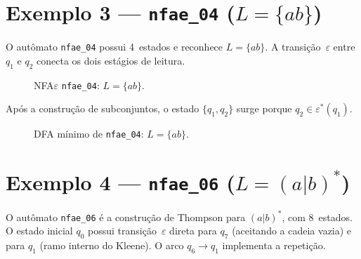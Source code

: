 \documentclass[sumario=abnt-6027-2012]{ifes8}
\newcommand{\eps}{\varepsilon}
\begin{document}
\section{Exemplo 3 --- \texttt{nfae\_04} \texorpdfstring{($L = \{ab\}$)}{(L = {ab})}}

O autômato \texttt{nfae\_04} possui 4~estados e reconhece $L = \{ab\}$.
A transição~$\varepsilon$ entre $q_1$ e $q_2$ conecta os dois estágios
de leitura.

\begin{figure}[H]
  \centering
  \caption{NFA$\varepsilon$ \texttt{nfae\_04}: $L = \{ab\}$.}
  \label{fig:nfae04-nfae}
\end{figure}

Após a construção de subconjuntos, o estado $\{q_1,q_2\}$ surge porque
$q_2 \in \varepsilon^*(q_1)$.

\begin{figure}[H]
  \centering
  \caption{DFA mínimo de \texttt{nfae\_04}: $L = \{ab\}$.}
  \label{fig:nfae04-dfa}
\end{figure}

\section{Exemplo 4 --- \texttt{nfae\_06} \texorpdfstring{($L = (a|b)^*$)}{(L = (a|b)*)}}

O autômato \texttt{nfae\_06} é a construção de Thompson para $(a|b)^*$,
com 8~estados. O estado inicial $q_0$ possui transição~$\varepsilon$ direta
para $q_7$ (aceitando a cadeia vazia) e para $q_1$ (ramo interno do Kleene).
O arco $q_6 \to q_1$ implementa a repetição.
\end{document}

